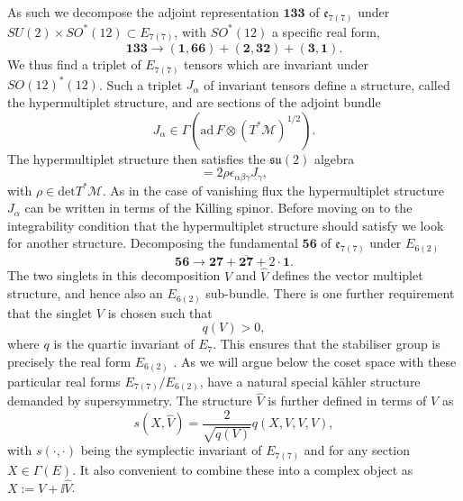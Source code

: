 As such we decompose the adjoint representation $\mathbf{133}$ of $\mathfrak{e}_{7(7)}$ under $SU(2)\times SO^*(12)\subset E_{7(7)}$, with $SO^*(12)$ a specific real form,
\begin{equation}
    \mathbf{133}\to (\mathbf{1},\mathbf{66})+(\mathbf{2},\mathbf{32})+(\mathbf{3},\mathbf{1}).
\end{equation}
We thus find a triplet of $E_{7(7)}$ tensors which are invariant under $SO(12)^*(12)$. Such a triplet $J_\alpha$ of invariant tensors define a structure, called the hypermultiplet structure, and are sections of the adjoint bundle 
\begin{equation}
    J_\alpha \in \Gamma(\text{ad}\, F\otimes \left(T^*\mathcal{M}\right)^{1/2}).
\end{equation}
The hypermultiplet structure then satisfies the $\mathfrak{su}(2)$ algebra 
\begin{equation}
    [J_\alpha,J_\beta] =2\rho \epsilon_{\alpha\beta\gamma}J_\gamma,
\end{equation}
with $\rho\in\text{det}T^*\mathcal{M}$. As in the case of vanishing flux the hypermultiplet structure $J_\alpha$ can be written in terms of the Killing spinor. Before moving on to the integrability condition that the hypermultiplet structure should satisfy we look for another structure. Decomposing the fundamental $\mathbf{56}$ of $\mathfrak{e}_{7(7)}$ under $E_{6(2)}$
\begin{equation}
    \mathbf{56}\to\mathbf{27}+\overbar{\mathbf{27}}+2\cdot \mathbf{1}.
\end{equation}
The two singlets in this decomposition $V$ and $\hat{V}$ defines the vector multiplet structure, and hence also an $E_{6(2)}$ sub-bundle. There is one further requirement that the singlet $V$ is chosen such that 
\begin{equation}
    q(V)>0,
\end{equation}
where $q$ is the quartic invariant of $E_7$. This ensures that the stabiliser group is precisely the real form $E_{6(2)}$ \cite{Ferrara:1997uz}. As we will argue below the coset space with these particular real forms $E_{7(7)}/E_{6(2)}$, have a natural special kähler structure demanded by supersymmetry. The structure $\hat{V}$ is further defined in terms of $V$ as 
\begin{equation}
    s(X,\hat{V}) = \frac{2}{\sqrt{q(V)}}q(X,V,V,V),
\end{equation}
with $s(\cdot,\cdot)$ being the symplectic invariant of $E_{7(7)}$ and for any section $X\in\Gamma(E)$. It also convenient to combine these into a complex object as $X:= V+\ii\hat{V}$. 

